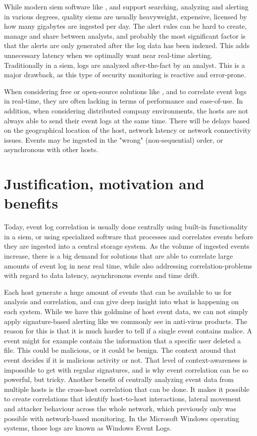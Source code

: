 While modern \acrshort{siem} software like \textcite{Splunk}, \textcite{QRadar} and \textcite{NetWitness} support searching, analyzing and alerting in various degrees, quality \acrshort{siem}s are usually heavyweight, expensive, licensed by how many gigabytes are ingested per day. The alert rules can be hard to create, manage and share between analysts, and probably the most significant factor is that the alerts are only generated after the log data has been indexed. This adds unnecessary latency when we optimally want near real-time alerting. Traditionally in a \acrshort{siem}, logs are analyzed after-the-fact by an analyst. This is a major drawback, as this type of security monitoring is reactive and error-prone.

When considering free or open-source solutions like \textcite{OSSIM}, \textcite{OSSEC} and \textcite{SEC-website} to correlate event logs in real-time, they are often lacking in terms of performance and ease-of-use.
In addition, when considering distributed company environments, the hosts are not always able to send their event logs at the same time. There will be delays based on the geographical location of the host, network latency or network connectivity issues. Events may be ingested in the "wrong" (non-sequential) order, or asynchronous with other hosts.

\section{Justification, motivation and benefits}
\label{sec:motivation}
Today, event log correlation is usually done centrally using built-in functionality in a \acrshort{siem}, or using specialized software that processes and correlates events before they are ingested into a central storage system.
As the volume of ingested events increase, there is a big demand for solutions that are able to correlate large amounts of event log in near real time, while also addressing correlation-problems with regard to data latency, asynchronous events and time drift.

Each host generate a huge amount of events that can be available to us for analysis and correlation, and can give deep insight into what is happening on each system. While we have this goldmine of host event data, we can not simply apply signature-based alerting like we commonly see in anti-virus products. The reason for this is that it is much harder to tell if a single event contains malice. A event might for example contain the information that a specific user deleted a file. This could be malicious, or it could be benign. The context around that event decides if it is malicious activity or not. That level of context-awareness is impossible to get with regular signatures, and is why event correlation can be so powerful, but tricky.
Another benefit of centrally analyzing event data from multiple hosts is the cross-host correlation that can be done. It makes it possible to create correlations that identify host-to-host interactions, lateral movement and attacker behaviour across the whole network, which previously only was possible with network-based monitoring. In the Microsoft Windows operating systems, those logs are known as Windows Event Logs.

